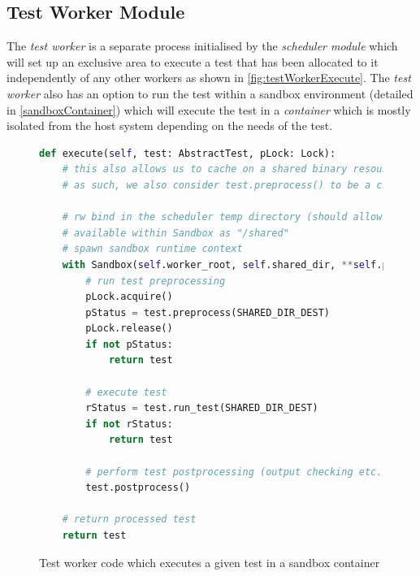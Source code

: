 \documentclass[hidelinks]{report}
\begin{document}
\subsection{Test Worker Module}\label{testWorker}
The \textit{test worker} is a separate process initialised by the \textit{scheduler module} which will set up an exclusive area to execute a test that has been allocated to it independently of any other workers as shown in \autoref{fig:testWorkerExecute}. The \textit{test worker} also has an option to run the test within a sandbox environment (detailed in \autoref{sandboxContainer}) which will execute the test in a \textit{container} which is mostly isolated from the host system depending on the needs of the test.
\begin{figure}[h]
	\centering
	\begin{lstlisting}[language=python, breaklines=true, linewidth=\linewidth, tabsize=4]
def execute(self, test: AbstractTest, pLock: Lock):
    # this also allows us to cache on a shared binary resource
    # as such, we also consider test.preprocess() to be a critical section

    # rw bind in the scheduler temp directory (should allow caching between worker processes but must use lock)
    # available within Sandbox as "/shared" 
    # spawn sandbox runtime context
    with Sandbox(self.worker_root, self.shared_dir, **self.parameters) as sb:
        # run test preprocessing
        pLock.acquire()
        pStatus = test.preprocess(SHARED_DIR_DEST)
        pLock.release()
        if not pStatus:
            return test

        # execute test
        rStatus = test.run_test(SHARED_DIR_DEST)
        if not rStatus:
            return test

        # perform test postprocessing (output checking etc.)
        test.postprocess()

    # return processed test
    return test
	\end{lstlisting}
	\caption{Test worker code which executes a given test in a sandbox container}
	\label{fig:testWorkerExecute}
\end{figure}
\end{document}

